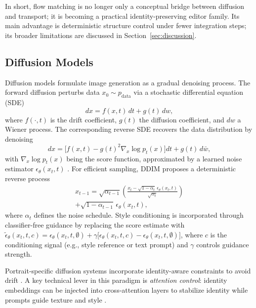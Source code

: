 \documentclass[journal]{IEEEtran}
\begin{document}
In short, flow matching is no longer only a conceptual bridge between diffusion and transport; it is becoming a practical identity-preserving editor family. Its main advantage is deterministic structure control under fewer integration steps; its broader limitations are discussed in Section~\ref{sec:discussion}.

\subsection{Diffusion Models}
\label{sec:theory:diffusion}
Diffusion models formulate image generation as a gradual denoising process. The forward diffusion perturbs data $x_0 \sim p_{\text{data}}$ via a stochastic differential equation (SDE)
\begin{equation}
dx = f(x,t)\,dt + g(t)\,dw,
\end{equation}
where $f(\cdot,t)$ is the drift coefficient, $g(t)$ the diffusion coefficient, and $dw$ a Wiener process. The corresponding reverse SDE recovers the data distribution by denoising
\begin{equation}
dx = \bigl[f(x,t) - g(t)^2 \nabla_x \log p_t(x)\bigr] dt + g(t)\,d\bar{w},
\end{equation}
with $\nabla_x \log p_t(x)$ being the score function, approximated by a learned noise estimator $\epsilon_\theta(x_t,t)$ \cite{ho2020denoising,song2020denoising}. For efficient sampling, DDIM \cite{song2020denoising} proposes a deterministic reverse process
\begin{multline}
x_{t-1} = \sqrt{\alpha_{t-1}} \left( \frac{x_t - \sqrt{1-\alpha_t}\,\epsilon_\theta(x_t,t)}{\sqrt{\alpha_t}} \right) \\
+ \sqrt{1-\alpha_{t-1}}\,\epsilon_\theta(x_t,t),
\end{multline}
where $\alpha_t$ defines the noise schedule. Style conditioning is incorporated through classifier-free guidance by replacing the score estimate with $\tilde{\epsilon}_\theta(x_t,t,c) = \epsilon_\theta(x_t,t,\emptyset) + \gamma\bigl[\epsilon_\theta(x_t,t,c) - \epsilon_\theta(x_t,t,\emptyset)\bigr]$, where $c$ is the conditioning signal (e.g., style reference or text prompt) and $\gamma$ controls guidance strength.

Portrait-specific diffusion systems incorporate identity-aware constraints to avoid drift \cite{meng2021sdedit,kim2023diffface}. A key technical lever in this paradigm is \emph{attention control}: identity embeddings can be injected into cross-attention layers to stabilize identity while prompts guide texture and style \cite{wang2024instantid,zhang2023adding,ye2023ipadapter}.
\end{document}
